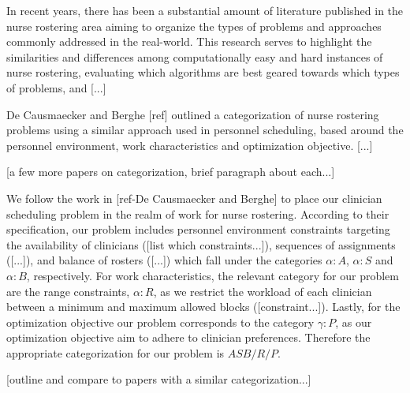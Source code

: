 In recent years, there has been a substantial amount of literature published in
the nurse rostering area aiming to organize the types of problems and approaches
commonly
addressed in the real-world. This research serves to highlight the similarities
and differences
among computationally easy and hard instances of nurse rostering, evaluating
which algorithms
are best geared towards which types of problems, and [...]

De Causmaecker and Berghe [ref] outlined a categorization
of nurse rostering problems using a similar approach used in personnel
scheduling,
based around the personnel environment, work characteristics and optimization
objective. [...]

[a few more papers on categorization, brief paragraph about each...]

We follow the work in [ref-De Causmaecker and Berghe] to place our clinician
scheduling problem
in the realm of work for nurse rostering. According to their specification, our
problem includes 
personnel environment constraints targeting the availability of clinicians
([list which constraints...]),
sequences of assignments ([...]), and balance of rosters ([...]) 
which fall under the categories $\alpha : A$, $\alpha : S$ and $\alpha : B$,
respectively. 
For work characteristics, the relevant category for our problem are the range
constraints, $\alpha : R$, 
as we restrict the workload of each clinician between a minimum and maximum
allowed blocks ([constraint...]).
Lastly, for the optimization objective our problem corresponds to the category
$\gamma : P$, as our optimization objective
aim to adhere to clinician preferences. Therefore the appropriate categorization
for our problem is $ASB/R/P$.

[outline and compare to papers with a similar categorization...]
